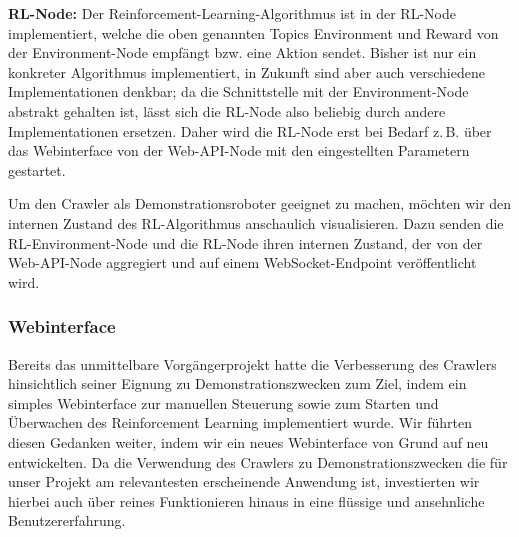 \textbf{RL-Node:} Der Reinforcement-Learning-Algorithmus ist in der RL-Node implementiert, welche die oben genannten Topics Environment und Reward von der Environment-Node empfängt bzw. eine Aktion sendet. Bisher ist nur ein konkreter Algorithmus implementiert, in Zukunft sind aber auch verschiedene Implementationen denkbar; da die Schnittstelle mit der Environment-Node abstrakt gehalten ist, lässt sich die RL-Node also beliebig durch andere Implementationen ersetzen. Daher wird die RL-Node erst bei Bedarf z.\,B. über das Webinterface von der Web-API-Node mit den eingestellten Parametern gestartet.

Um den Crawler als Demonstrationsroboter geeignet zu machen, möchten wir den internen Zustand des RL-Algorithmus anschaulich visualisieren. Dazu senden die RL-Environment-Node und die RL-Node ihren internen Zustand, der von der Web-API-Node aggregiert und auf einem WebSocket-Endpoint veröffentlicht wird. 

\subsubsection{Webinterface}

Bereits das unmittelbare Vorgängerprojekt hatte die Verbesserung des Crawlers hinsichtlich seiner Eignung zu Demonstrationszwecken zum Ziel, indem ein simples Webinterface zur manuellen Steuerung sowie zum Starten und Überwachen des Reinforcement Learning implementiert wurde. Wir führten diesen Gedanken weiter, indem wir ein neues Webinterface von Grund auf neu entwickelten. Da die Verwendung des Crawlers zu Demonstrationszwecken die für unser Projekt am relevantesten erscheinende Anwendung ist, investierten wir hierbei auch über reines Funktionieren hinaus in eine flüssige und ansehnliche Benutzererfahrung. 

